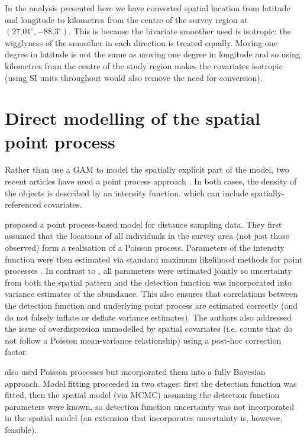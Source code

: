 \documentclass[a4paper,12pt]{article}
\begin{document}
In the analysis presented here we have converted spatial location from latitude and longitude to kilometres from the centre of the survey region at $(27.01^\circ, -88.3^\circ)$. This is because the bivariate smoother used \citep[the thin plate spline;][]{Wood:2003tc} is isotropic: the wigglyness of the smoother in each direction is treated equally. Moving one degree in latitude is not the same as moving one degree in longitude and so using kilometres from the centre of the study region makes the covariates isotropic (using SI units throughout would also remove the need for conversion).


\section*{Direct modelling of the spatial point process}
\label{s:direct}

Rather than use a GAM to model the spatially explicit part of the model, two recent articles \citep{Johnson:2010gf,Niemi:2010kx} have used a point process \citep{cox1980point} approach \citep[which was formulated by][]{Hedley:2004et}. In both cases, the density of the objects is described by an intensity function, which can include spatially-referenced covariates.

\cite{Johnson:2010gf} proposed a point process-based model for distance sampling data. They first assumed that the locations of all individuals in the survey area (not just those observed) form a realisation of a Poisson process. Parameters of the intensity function were then estimated via standard maximum likelihood methods for point processes \citep{Baddeley:2000to}. In contrast to \cite{Hedley:2004et}, all parameters were estimated jointly so uncertainty from both the spatial pattern and the detection function was incorporated into variance estimates of the abundance. This also ensures that correlations between the detection function and underlying point process are estimated correctly (and do not falsely inflate or deflate variance estimates). The authors also addressed the issue of overdispersion unmodelled by spatial covariates (i.e. counts that do not follow a Poisson mean-variance relationship) using a post-hoc correction factor.

\cite{Niemi:2010kx} also used Poisson processes but incorporated them into a fully Bayesian approach. Model fitting proceeded in two stages: first the detection function was fitted, then the spatial model (via MCMC) assuming the detection function parameters were known, so detection function uncertainty was not incorporated in the spatial model (an extension that incorporates uncertainty is, however, feasible).
\end{document}
